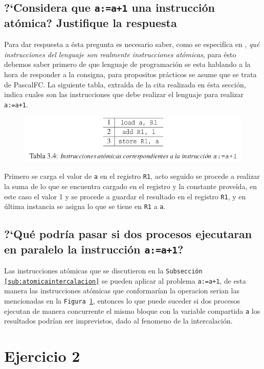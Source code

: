 \documentclass{article}
\begin{document}
\subsection{?`Considera que \texttt{a:=a+1} una instrucci\'on at\'omica? Justifique la respuesta}
Para dar respuesta a \'esta pregunta es necesario saber, como se especif\'ica en \cite{gortazarbellas}, \textit{qu\'e instrucciones del lenguaje son realmente instrucciones at\'omicas}, para \'esto debemos saber primero de que lenguaje de programaci\'on se esta hablando a la hora de responder a la consigna, para propositos pr\'acticos se asume que se trata de PascalFC.
La siguiente tabla, extra\'ida de la cita realizada en \'esta secci\'on, indica cuales son las instrucciones que debe realizar el lenguaje para realizar \texttt{a:=a+1}.
\begin{figure}[H]
  \centering
  \includegraphics[width=.5\linewidth]{a+1.png}
  \label{fig:a1}
\end{figure}
Primero se carga el valor de \texttt{a} en el registro \texttt{R1}, acto seguido se procede a realizar la suma de lo que se encuentra cargado en el registro y la constante prove\'ida, en este caso el valor 1 y se procede a guardar el resultado en el registro \texttt{R1}, y en \'ultima instancia se asigna lo que se tiene en \texttt{R1} a \texttt{a}.

\subsection{?`Qu\'e podr\'ia pasar si dos procesos ejecutaran en paralelo la instrucci\'on \texttt{a:=a+1}?}
Las instrucciones at\'omicas que se discutieron en la \texttt{Subsecci\'on \ref{sub:atomicaintercalacion}} se pueden aplicar al problema \texttt{a:=a+1}, de esta manera las instrucciones at\'omicas que conformar\'ian la operacion serian las mencionadas en la \texttt{Figura \ref{fig:a1}}, entonces lo que puede suceder si dos procesos ejecutan de manera concurrente el mismo bloque con la variable compartida \texttt{a} los resultados podr\'ian ser imprevistos, dado al fenomeno de la intercalaci\'on.

\section{Ejercicio 2}
\end{document}
